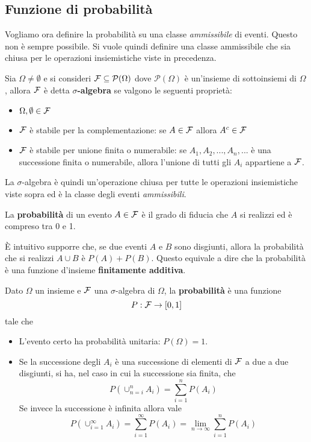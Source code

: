 \subsection{Funzione di probabilità}
Vogliamo ora definire la probabilità su una classe \emph{ammissibile} di eventi. Questo non è 
sempre possibile. Si vuole quindi definire una classe ammissibile che sia chiusa per le operazioni
insiemistiche viste in precedenza.

\begin{definition}
	Sia $\Omega \neq \emptyset$ e si consideri $\mathcal{F} \subseteq \mathcal{P}(\Omega)$ dove 
	$\mathcal{P}(\Omega)$ è
	un'insieme di sottoinsiemi di $\Omega$, allora $\mathcal{F}$ è detta $\sigma$\textbf{-algebra} se
	valgono le seguenti proprietà:
	\begin{itemize}
		\item $\Omega, \emptyset \in \mathcal{F}$
		\item $\mathcal{F}$ è stabile per la complementazione: se $A \in \mathcal{F}$ allora $A^c \in \mathcal{F}$
		\item $\mathcal{F}$ è stabile per unione finita o numerabile: se $A_1, A_2, ..., A_n, ...$ è una 
			successione finita o numerabile, allora l'unione di tutti gli $A_i$ appartiene a $\mathcal{F}$.
	\end{itemize}
\end{definition}

La $\sigma$-algebra è quindi un'operazione chiusa per tutte le operazioni insiemistiche viste
sopra ed è la classe degli eventi \emph{ammissibili}.

La \textbf{probabilità} di un evento $A \in \mathcal{F}$ è il grado di fiducia che $A$ si realizzi ed è 
compreso tra 0 e 1.

\`E intuitivo supporre che, se due eventi $A$ e $B$ sono disgiunti, allora la probabilità che si
realizzi $A \cup B$ è $P(A) + P(B)$. Questo equivale a dire che la probabilità è una funzione 
d'insieme \textbf{finitamente additiva}.

\begin{definition}
	Dato $\Omega$ un insieme e $\mathcal{F}$ una $\sigma$-algebra di $\Omega$, la \textbf{probabilità} è
	una funzione
	\[ P : \mathcal{F} \to [0, 1] \]
	tale che
	\begin{itemize}
		\item L'evento certo ha probabilità unitaria: $P(\Omega) = 1$.
		\item Se la successione degli $A_i$ è una successione di elementi di $\mathcal{F}$ a due a due
			disgiunti, si ha, nel caso in cui la successione sia finita, che
			\[ P (\cup_{n=i}^n A_i) = \sum_{i=1}^n P(A_i) \]
			Se invece la successione è infinita allora vale
			\[
				P (\cup_{i=1}^\infty A_i) = \sum_{i=1}^\infty P(A_i) =
				\lim_{n \to \infty} \sum_{i=1}^n P(A_i)
			\]
	\end{itemize}
\end{definition}

